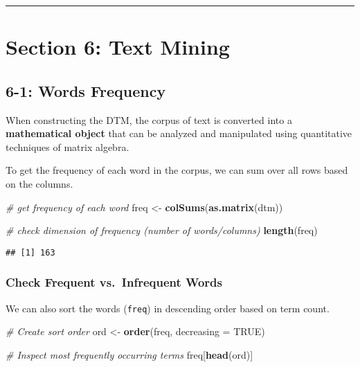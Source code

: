 \documentclass[
]{article}
\newenvironment{Shaded}{\begin{snugshade}}{\end{snugshade}}
\newcommand{\CommentTok}[1]{\textcolor[rgb]{0.56,0.35,0.01}{\textit{#1}}}
\newcommand{\DataTypeTok}[1]{\textcolor[rgb]{0.13,0.29,0.53}{#1}}
\newcommand{\KeywordTok}[1]{\textcolor[rgb]{0.13,0.29,0.53}{\textbf{#1}}}
\newcommand{\NormalTok}[1]{#1}
\newcommand{\OtherTok}[1]{\textcolor[rgb]{0.56,0.35,0.01}{#1}}
\newcommand{\StringTok}[1]{\textcolor[rgb]{0.31,0.60,0.02}{#1}}
\begin{document}
\begin{center}\rule{0.5\linewidth}{0.5pt}\end{center}

\hypertarget{section-6-text-mining}{%
\section{Section 6: Text Mining}\label{section-6-text-mining}}

\hypertarget{words-frequency}{%
\subsection{6-1: Words Frequency}\label{words-frequency}}

When constructing the DTM, the corpus of text is converted into a
\textbf{mathematical object} that can be analyzed and manipulated using
quantitative techniques of matrix algebra.

To get the frequency of each word in the corpus, we can sum over all
rows based on the columns.

\begin{Shaded}
\begin{Highlighting}[]
\CommentTok{# get frequency of each word}
\NormalTok{freq <-}\StringTok{ }\KeywordTok{colSums}\NormalTok{(}\KeywordTok{as.matrix}\NormalTok{(dtm))}

\CommentTok{# check dimension of frequency (number of words/columns)}
\KeywordTok{length}\NormalTok{(freq)}
\end{Highlighting}
\end{Shaded}

\begin{verbatim}
## [1] 163
\end{verbatim}

\hypertarget{check-frequent-vs.-infrequent-words}{%
\subsubsection{Check Frequent vs.~Infrequent
Words}\label{check-frequent-vs.-infrequent-words}}

We can also sort the words (\texttt{freq}) in descending order based on
term count.

\begin{Shaded}
\begin{Highlighting}[]
\CommentTok{# Create sort order}
\NormalTok{ord <-}\StringTok{ }\KeywordTok{order}\NormalTok{(freq, }\DataTypeTok{decreasing =} \OtherTok{TRUE}\NormalTok{)}

\CommentTok{# Inspect most frequently occurring terms}
\NormalTok{freq[}\KeywordTok{head}\NormalTok{(ord)]}
\end{Highlighting}
\end{Shaded}
\end{document}
